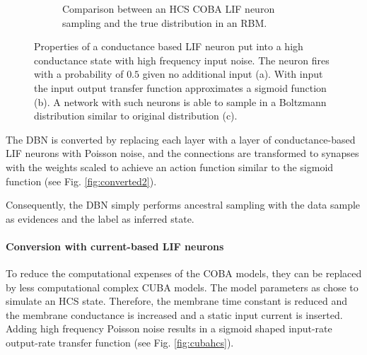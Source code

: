 \begin{figure}
\begin{subfigure}[t]{.5\textwidth}
  		\caption{Comparison between an HCS COBA LIF neuron sampling and the true distribution in an RBM.}
  		\label{fig:cobahcs3}
	\end{subfigure}
	\caption[Properties of a conductance based LIF neuron in a high conductance state.]{Properties of a conductance based LIF neuron put into a high conductance state with high frequency input noise. The neuron fires with a probability of $0.5$ given no additional input (a). With input the input output transfer function approximates a sigmoid function (b). A network with such neurons is able to sample in a Boltzmann distribution similar to original distribution (c). }
	\label{fig:cobahcs}

\end{figure}
  
The DBN is converted by replacing each layer with a layer of conductance-based LIF neurons with Poisson noise, and the connections are transformed to synapses with the weights scaled to achieve an action function similar to the sigmoid function (see Fig. \ref{fig:converted2}).

Consequently, the DBN simply performs ancestral sampling with the data sample as evidences and the label as inferred state.   


\paragraph{Conversion with current-based LIF neurons} \label{c:convascuba}

To reduce the computational expenses of the COBA models, they can be replaced by less computational complex CUBA models.
The model parameters as chose to simulate an HCS state.
Therefore, the membrane time constant is reduced and the membrane conductance is increased and a static input current is inserted.  
Adding high frequency Poisson noise results in a sigmoid shaped input-rate output-rate transfer function (see Fig. \ref{fig:cubahcs}).

